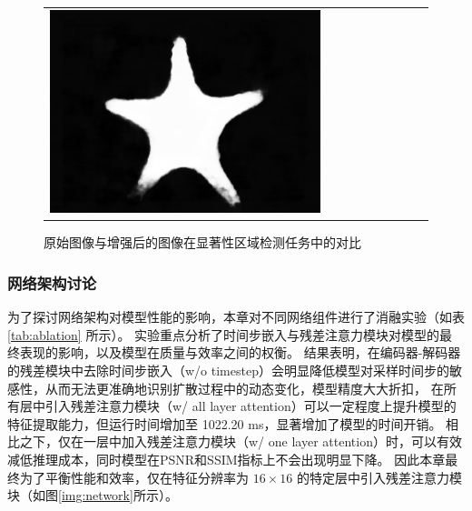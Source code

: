 \begin{figure}[ht]
\begin{center}
\begin{tabular}{ccccccccc}
            \includegraphics[width = 0.10\linewidth, height=0.10\linewidth]{figures/ch3/compare/discussion/SOD/sod/9.png}  \\
		\end{tabular}
	\end{center}
	\caption{\label{img:sod}原始图像与增强后的图像在显著性区域检测任务中的对比}
	\vspace{-2mm}
\end{figure}     %

\subsubsection{网络架构讨论}
为了探讨网络架构对模型性能的影响，本章对不同网络组件进行了消融实验（如表 \ref{tab:ablation} 所示）。
实验重点分析了时间步嵌入与残差注意力模块对模型的最终表现的影响，以及模型在质量与效率之间的权衡。
结果表明，在编码器-解码器的残差模块中去除时间步嵌入（w/o timestep）会明显降低模型对采样时间步的敏感性，从而无法更准确地识别扩散过程中的动态变化，模型精度大大折扣，
在所有层中引入残差注意力模块（w/ all layer attention）可以一定程度上提升模型的特征提取能力，但运行时间增加至 1022.20 ms，显著增加了模型的时间开销。
相比之下，仅在一层中加入残差注意力模块（w/ one layer attention）时，可以有效减低推理成本，同时模型在PSNR和SSIM指标上不会出现明显下降。
因此本章最终为了平衡性能和效率，仅在特征分辨率为 $16 \times 16$ 的特定层中引入残差注意力模块（如图\ref{img:network}所示）。
\begin{table}[ht]
    \vspace{-0.4mm}
    \centering
    \caption{\label{tab:ablation}消融实验结果}
    \vspace{1mm}
\end{table}

